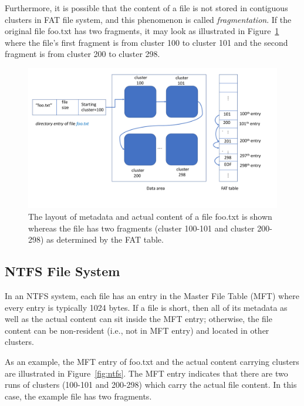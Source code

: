Furthermore, it is possible that the content of a file is not stored in contiguous clusters in FAT file system, 
and this phenomenon is called \emph{fragmentation}.
If the original file foo.txt has two fragments, it may look as illustrated in Figure~\ref{fig:fat3} where the file's first fragment is from cluster 100 to cluster 101 and the 
second fragment is from cluster 200 to cluster 298. 

\begin{figure}[h]
    \centering
    \includegraphics[width=\linewidth]{fig/fat3.pdf}
    \caption{The layout of metadata and actual content of a file foo.txt is shown whereas the file has two fragments (cluster 100-101 and cluster 200-298) 
as determined by the FAT table.}
    \label{fig:fat3}
\end{figure}
\subsection{NTFS File System}
In an NTFS system, each file has an entry in the Master File Table (MFT) where every entry is typically 1024 bytes. 
If a file is short, then all of its metadata as well as the actual content can sit inside the MFT entry; otherwise, 
the file content can be non-resident (i.e., not in MFT entry) and located in other clusters.
  
As an example, the MFT entry of foo.txt and the actual content carrying clusters are illustrated in Figure~\ref{fig:ntfs}.
The MFT entry indicates that there are two runs of clusters (100-101 and 200-298) which carry the actual file content. 
In this case, the example file has two fragments.

